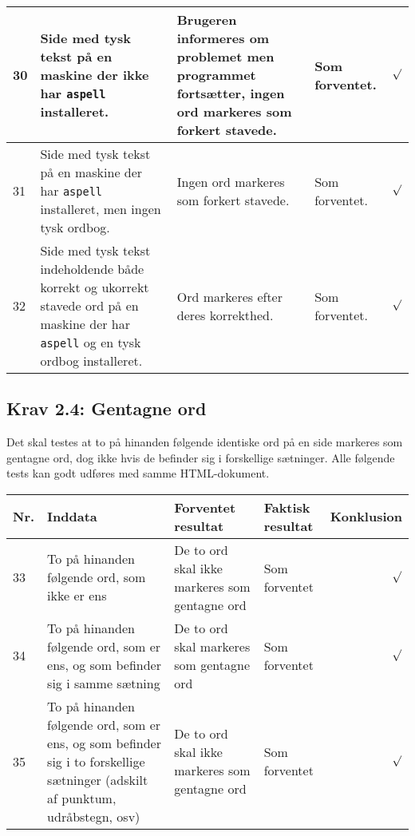 \documentclass[a4paper,oneside,article]{memoir}
\begin{document}
\begin{landscape}
\begin{longtable}[c]{p{20pt}|p{220pt}|p{130pt}|p{130pt}|r}
30 &
Side med tysk tekst på en maskine der ikke har \texttt{aspell}
installeret. &
Brugeren informeres om problemet men programmet fortsætter, ingen ord
markeres som forkert stavede. &
Som forventet. &
$\surd$ \\ \hline

31 &
Side med tysk tekst på en maskine der har \texttt{aspell}
installeret, men ingen tysk ordbog. &
Ingen ord markeres som forkert stavede. &
Som forventet. &
$\surd$ \\ \hline

32 &
Side med tysk tekst indeholdende både korrekt og ukorrekt stavede ord
på en maskine der har \texttt{aspell} og en tysk ordbog installeret. &
Ord markeres efter deres korrekthed. &
Som forventet. &
$\surd$ \\ \hline

\end{longtable}

\subsection{Krav 2.4: Gentagne ord}

Det skal testes at to på hinanden følgende identiske ord på en side
markeres som gentagne ord, dog ikke hvis de befinder sig i forskellige
sætninger. Alle følgende tests kan godt udføres med samme
HTML-dokument.

\begin{longtable}[c]{p{20pt}|p{220pt}|p{130pt}|p{130pt}|r}
\textbf{Nr.} &
\textbf{Inddata} &
\textbf{Forventet resultat} &
\textbf{Faktisk resultat} &
\textbf{Konklusion} \\ \hline

33 &
To på hinanden følgende ord, som ikke er ens &
De to ord skal ikke markeres som gentagne ord &
Som forventet &
$\surd$ \\ \hline

34 &
To på hinanden følgende ord, som er ens, og som befinder sig i samme
sætning &
De to ord skal markeres som gentagne ord &
Som forventet &
$\surd$ \\ \hline

35 &
To på hinanden følgende ord, som er ens, og som befinder sig i
to forskellige sætninger (adskilt af punktum, udråbstegn, osv) &
De to ord skal ikke markeres som gentagne ord &
Som forventet &
$\surd$ \\ \hline

\end{longtable}


\end{landscape}
\end{document}
